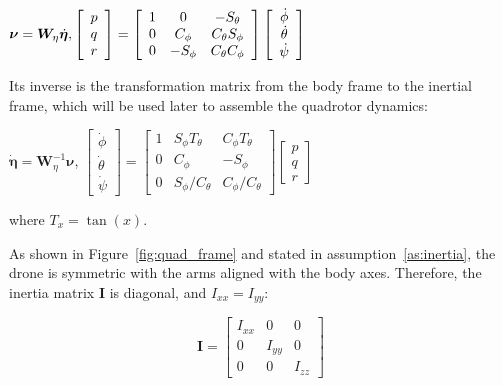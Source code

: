 \documentclass[letterpaper, 10 pt, conference]{ieeeconf}  %
\begin{document}
$\bm{\nu}=\bm{W}_{\eta} \dot{\bm{\eta}}, \hfill \left[ \begin{array}{l}{p} \\ {q} \\ {r}\end{array}\right]=\left[ \begin{array}{ccc}{1} & {0} & {-S_{\theta}} \\ {0} & {C_{\phi}} & {C_{\theta} S_{\phi}} \\ {0} & {-S_{\phi}} & {C_{\theta} C_{\phi}}\end{array}\right] \left[ \begin{array}{c}{\dot{\phi}} \\ {\dot{\theta}} \\ {\dot{\psi}}\end{array}\right]$

Its inverse is the transformation matrix from the body frame to the inertial frame, which will be used later to assemble the quadrotor dynamics:

$\dot{\bm{\eta}}=\bm{W}_{\eta}^{-1} \bm{\nu}$, \hfill $\left[ \begin{array}{c}{\dot{\phi}} \\ {\dot{\theta}} \\ {\dot{\psi}}\end{array}\right]=\left[ \begin{array}{ccc}{1} & {S_{\phi} T_{\theta}} & {C_{\phi} T_{\theta}} \\ {0} & {C_{\phi}} & {-S_{\phi}} \\ {0} & {S_{\phi} / C_{\theta}} & {C_{\phi} / C_{\theta}}\end{array}\right] \left[ \begin{array}{l}{p} \\ {q} \\ {r}\end{array}\right]$

where $T_{x}=\tan (x)$.

As shown in Figure~\ref{fig:quad_frame} and stated in assumption~\ref{as:inertia}, the drone is symmetric with the arms aligned with the body axes. Therefore, the inertia matrix $\textbf{I}$ is diagonal, and $I_{xx} = I_{yy}$:

 $$\boldsymbol{I}=\left[ \begin{array}{ccc}{I_{x x}} & {0} & {0} \\ {0} & {I_{y y}} & {0} \\ {0} & {0} & {I_{z z}}\end{array}\right]$$
 
\end{document}
